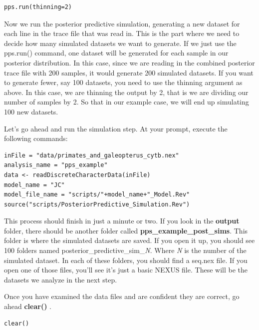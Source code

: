 {\tt \begin{snugshade*}
\begin{lstlisting}
pps.run(thinning=2)
\end{lstlisting}
\end{snugshade*}}
Now we run the posterior predictive simulation, generating a new dataset for each line in the trace file 
that was read in. This is the part where we need to decide how many simulated datasets we want to generate.
If we just use the pps.run() command, one dataset will be generated for each sample in our posterior distribution.
In this case, since we are reading in the combined posterior trace file with 200 
samples, it would generate 200 simulated datasets. If you want to generate fewer, say 100 datasets,
you need to use the thinning argument as above. In this case, we are thinning the output by 2, that is
we are dividing our number of samples by 2. So that in our example case, we will end up simulating 100 
new datasets.

Let's go ahead and run the simulation step. At your \RevBayes prompt, execute the following commands: 
{\tt \begin{Snugshade}[184,207,236]
\begin{lstlisting}
inFile = "data/primates_and_galeopterus_cytb.nex"
analysis_name = "pps_example"
data <- readDiscreteCharacterData(inFile)
model_name = "JC"
model_file_name = "scripts/"+model_name+"_Model.Rev"
source("scripts/PosteriorPredictive_Simulation.Rev")
\end{lstlisting}
\end{Snugshade}}

This process should finish in just a minute or two. If you look in the \textbf{output} folder, there should be 
another folder called \textbf{pps\_example\_post\_sims}. This folder is where the simulated datasets are saved. 
If you open it up, you should see 100 folders named posterior\_predictive\_sim\_\textit{N}. Where \textit{N} 
is the number of the simulated dataset. In each of these folders, you should find a seq.nex file. If you 
open one of those files, you'll see it's just a basic NEXUS file. These will be the datasets we analyze 
in the next step.

Once you have examined the data files and are confident they are correct, go ahead \textbf{clear()} \RevBayes.

{\tt \begin{Snugshade}[184,207,236]
\begin{lstlisting}
clear()
\end{lstlisting}
\end{Snugshade}}

